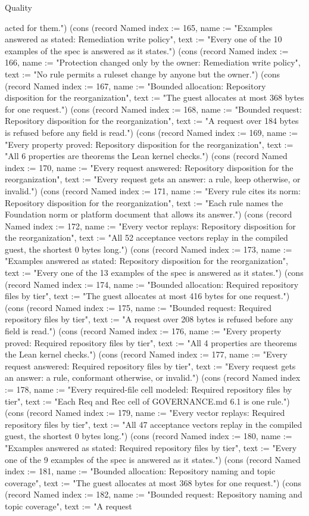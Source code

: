 \begin{lexlean}{Quality}
\begin{semanticmodule}
{acted for them."}) (cons (record Named {index := 165, name := "Examples answered as stated: Remediation write policy", text := "Every one of the 10 examples of the spec is answered as it states."}) (cons (record Named {index := 166, name := "Protection changed only by the owner: Remediation write policy", text := "No rule permits a ruleset change by anyone but the owner."}) (cons (record Named {index := 167, name := "Bounded allocation: Repository disposition for the reorganization", text := "The guest allocates at most 368 bytes for one request."}) (cons (record Named {index := 168, name := "Bounded request: Repository disposition for the reorganization", text := "A request over 184 bytes is refused before any field is read."}) (cons (record Named {index := 169, name := "Every property proved: Repository disposition for the reorganization", text := "All 6 properties are theorems the Lean kernel checks."}) (cons (record Named {index := 170, name := "Every request answered: Repository disposition for the reorganization", text := "Every request gets an answer: a rule, keep otherwise, or invalid."}) (cons (record Named {index := 171, name := "Every rule cites its norm: Repository disposition for the reorganization", text := "Each rule names the Foundation norm or platform document that allows its answer."}) (cons (record Named {index := 172, name := "Every vector replays: Repository disposition for the reorganization", text := "All 52 acceptance vectors replay in the compiled guest, the shortest 0 bytes long."}) (cons (record Named {index := 173, name := "Examples answered as stated: Repository disposition for the reorganization", text := "Every one of the 13 examples of the spec is answered as it states."}) (cons (record Named {index := 174, name := "Bounded allocation: Required repository files by tier", text := "The guest allocates at most 416 bytes for one request."}) (cons (record Named {index := 175, name := "Bounded request: Required repository files by tier", text := "A request over 208 bytes is refused before any field is read."}) (cons (record Named {index := 176, name := "Every property proved: Required repository files by tier", text := "All 4 properties are theorems the Lean kernel checks."}) (cons (record Named {index := 177, name := "Every request answered: Required repository files by tier", text := "Every request gets an answer: a rule, conformant otherwise, or invalid."}) (cons (record Named {index := 178, name := "Every required-file cell modeled: Required repository files by tier", text := "Each Req and Rec cell of GOVERNANCE.md 6.1 is one rule."}) (cons (record Named {index := 179, name := "Every vector replays: Required repository files by tier", text := "All 47 acceptance vectors replay in the compiled guest, the shortest 0 bytes long."}) (cons (record Named {index := 180, name := "Examples answered as stated: Required repository files by tier", text := "Every one of the 9 examples of the spec is answered as it states."}) (cons (record Named {index := 181, name := "Bounded allocation: Repository naming and topic coverage", text := "The guest allocates at most 368 bytes for one request."}) (cons (record Named {index := 182, name := "Bounded request: Repository naming and topic coverage", text := "A request }
\end{semanticmodule}
\end{lexlean}
